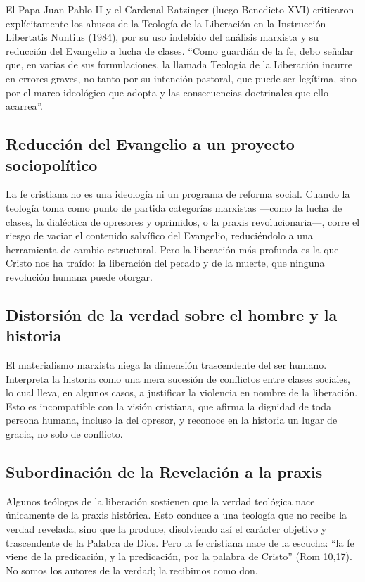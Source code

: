\documentclass[12pt]{article}
\begin{document}
El Papa Juan Pablo II y el Cardenal Ratzinger (luego Benedicto XVI) criticaron explícitamente los abusos de la Teología de la Liberación en la Instrucción Libertatis Nuntius (1984), por su uso indebido del análisis marxista y su reducción del Evangelio a lucha de clases. ``Como guardián de la fe, debo señalar que, en varias de sus formulaciones, la llamada Teología de la Liberación incurre en errores graves, no tanto por su intención pastoral, que puede ser legítima, sino por el marco ideológico que adopta y las consecuencias doctrinales que ello acarrea''.

\subsection*{Reducción del Evangelio a un proyecto sociopolítico}
La fe cristiana no es una ideología ni un programa de reforma social. Cuando la teología toma como punto de partida categorías marxistas —como la lucha de clases, la dialéctica de opresores y oprimidos, o la praxis revolucionaria—, corre el riesgo de vaciar el contenido salvífico del Evangelio, reduciéndolo a una herramienta de cambio estructural. Pero la liberación más profunda es la que Cristo nos ha traído: la liberación del pecado y de la muerte, que ninguna revolución humana puede otorgar.

\subsection*{Distorsión de la verdad sobre el hombre y la historia}
El materialismo marxista niega la dimensión trascendente del ser humano. Interpreta la historia como una mera sucesión de conflictos entre clases sociales, lo cual lleva, en algunos casos, a justificar la violencia en nombre de la liberación. Esto es incompatible con la visión cristiana, que afirma la dignidad de toda persona humana, incluso la del opresor, y reconoce en la historia un lugar de gracia, no solo de conflicto.

\subsection*{Subordinación de la Revelación a la praxis}
Algunos teólogos de la liberación sostienen que la verdad teológica nace únicamente de la praxis histórica. Esto conduce a una teología que no recibe la verdad revelada, sino que la produce, disolviendo así el carácter objetivo y trascendente de la Palabra de Dios. Pero la fe cristiana nace de la escucha: ``la fe viene de la predicación, y la predicación, por la palabra de Cristo'' (Rom 10,17). No somos los autores de la verdad; la recibimos como don.
\end{document}
